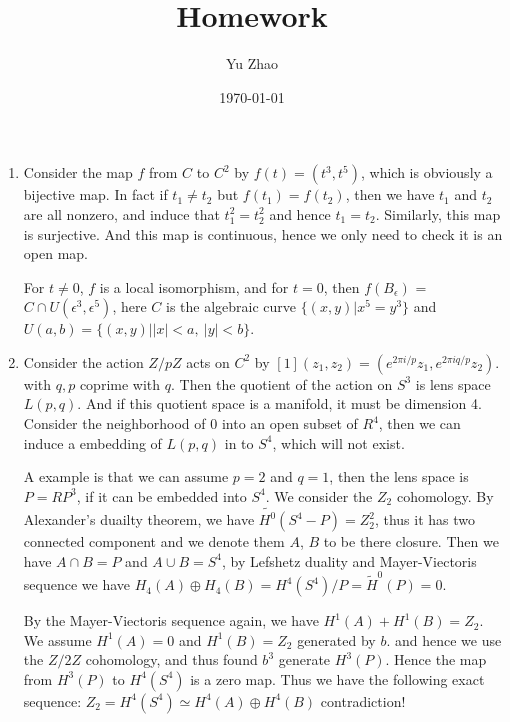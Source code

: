 \documentclass[11pt]{article}
\author{Yu Zhao}
\date{\today}
\title{Homework}
\begin{document}
\maketitle
\setcounter{secnumdepth}{-1}

\begin{enumerate}
\item Consider the map $f$ from $C$ to $C^{2}$ by $f(t)=(t^{3}, t^{5})$,
which is obviously a bijective map. In fact if $t_{1}\neq t_{2}$
but $f(t_{1})=f(t_{2})$, then we have $t_{1}$ and $t_{2}$ are all
nonzero, and induce that $t_{1}^{2}=t_{2}^{2}$ and hence
$t_{1}=t_{2}$. Similarly, this map is surjective. And this map is
continuous, hence we only need to check it is an open map.

For $t\neq 0$, $f$ is a local isomorphism, and for $t=0$, then
$f(B_{\epsilon})$ = $C \cap U(\epsilon^{3},\epsilon^{5})$, here $C$
is the algebraic curve $\{(x,y)|x^{5}=y^{3}\}$ and $U(a,b)
   =\{(x,y)| |x|<a, \ |y|<b\}$.

\item Consider the action $Z/pZ$ acts on $C^{2}$ by
$[1](z_{1},z_{2})=(e^{2\pi i/p}z_{1},e^{2\pi i q/p}z_{2})$.  with
$q, p$ coprime with $q$. Then the quotient of the action on $S^{3}$
is lens space $L(p,q)$. And if this quotient space is a manifold,
it must be dimension 4. Consider the neighborhood of $0$ into an
open subset of $R^{4}$, then we can induce a embedding of $L(p,q)$
in to $S^{4}$, which will not exist.

A example is that we can assume $p=2$ and $q=1$, then the lens space
is $P=RP^{3}$, if it can be embedded into $S^{4}$. We consider the
$Z_{2}$ cohomology. By Alexander's
duailty theorem, we have $\widetilde{H^{0}}(S^{4}-P)=Z_{2}^{2}$, thus
it has two connected component and we denote them $A$, $B$ to be
there closure. Then we have $A\cap B=P$ and $A\cup B=S^{4}$, by
Lefshetz duality and Mayer-Viectoris sequence we have
$H_{4}(A)\oplus H_{4}(B)=H^{4}(S^{4})/P= \tilde{H}^{0}(P)=0$. 

By the Mayer-Viectoris sequence again, we have
$H^{1}(A)+H^{1}(B)=Z_{2}$. We assume $H^{1}(A)=0$ and
$H^{1}(B)=Z_{2}$ generated by $b$. and hence we use the $Z/2Z$
cohomology, and thus found $b^{3}$ generate $H^{3}(P)$. Hence the
map from $H^{3}(P)$ to $H^{4}(S^{4})$ is a zero map. Thus we have
the following exact sequence: $Z_{2}=H^{4}(S^{4}) \simeq H^{4}(A)
   \oplus  H^{4}(B)$ contradiction!
\end{enumerate}
\end{document}
